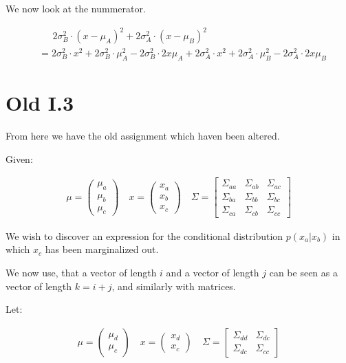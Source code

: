 We now look at the nummerator.

\begin{align*}
&\phantom{\text{ = }} 2\sigma_B^2 \cdot (x-\mu_A)^2+2\sigma_A^2 \cdot (x-\mu_B)^2 \\
&=
2\sigma_B^2 \cdot x^2 + 2\sigma_B^2 \cdot \mu_A^2 - 2\sigma_B^2 \cdot 2x\mu_A +
2\sigma_A^2 \cdot x^2 + 2\sigma_A^2 \cdot \mu_B^2 - 2\sigma_A^2 \cdot 2x\mu_B
\end{align*}

\section*{Old I.3}

From here we have the old assignment which haven been altered.

Given:

\begin{align*}
	\mu = \begin{pmatrix}
		\mu_a \\
		\mu_b \\
		\mu_c
	\end{pmatrix} \quad
	x = \begin{pmatrix}
		x_a \\
		x_b \\
		x_c
	\end{pmatrix} \quad
	\Sigma = \begin{bmatrix}
		\Sigma_{aa} & \Sigma_{ab} & \Sigma_{ac} \\
		\Sigma_{ba} & \Sigma_{bb} & \Sigma_{bc} \\
		\Sigma_{ca} & \Sigma_{cb} & \Sigma_{cc}
	\end{bmatrix}
\end{align*}

We wish to discover an expression for the conditional distribution $p(x_a|x_b)$
in which $x_c$ has been marginalized out.

We now use, that a vector of length $i$ and a vector of length $j$
can be seen as a vector of length $k=i+j$, and similarly with matrices.

Let:

\begin{align*}
	\mu = \begin{pmatrix}
		\mu_d \\
		\mu_c
	\end{pmatrix} \quad
	x = \begin{pmatrix}
		x_d \\
		x_c
	\end{pmatrix} \quad
	\Sigma = \begin{bmatrix}
		\Sigma_{dd} & \Sigma_{dc} \\
		\Sigma_{dc} & \Sigma_{cc}
	\end{bmatrix}
\end{align*}

